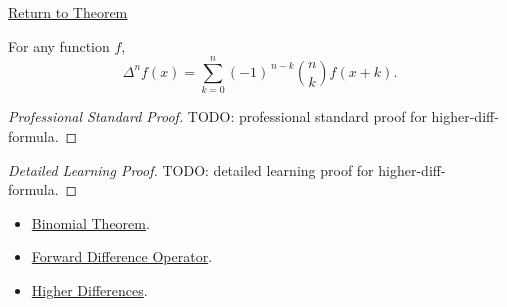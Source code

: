 \newpage
{}
\label{prf:higher-diff-formula}

\begin{remark*}[Return]
\hyperref[prop:higher-diff-formula]{Return to Theorem}
\end{remark*}

\begin{proposition*}
For any function \(f\),
\[
\Delta^n f(x)
=
\sum_{k=0}^{n} (-1)^{\,n-k}
\binom{n}{k}
f(x+k).
\]
\end{proposition*}

\begin{proof}[Professional Standard Proof]
\LRAProofBodyStart
TODO: professional standard proof for higher-diff-formula.
\end{proof}

\begin{proof}[Detailed Learning Proof]
\LRAProofBodyStart
TODO: detailed learning proof for higher-diff-formula.
\end{proof}

\begin{remark*}
\end{remark*}

\begin{dependencies}
\begin{itemize}
  \item \hyperref[thm:binomial-theorem]{Binomial Theorem}.
  \item \hyperref[def:forward-difference]{Forward Difference Operator}.
  \item \hyperref[def:higher-differences]{Higher Differences}.
\end{itemize}
\end{dependencies}

\clearpage
